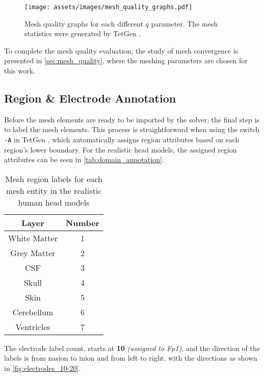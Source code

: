 \begin{figure}[H]
    \centering
    \texttt{[image: assets/images/mesh\_quality\_graphs.pdf]}
    \caption[Mesh quality graphs for each different $q$ parameter]{Mesh quality graphs for each different $q$ parameter. The mesh statistics were generated by TetGen \cite{tetgen}.}
    \label{fig:mesh_quality_graphs}
\end{figure}

To complete the mesh quality evaluation, the study of mesh convergence is presented in \autoref{sec:mesh_quality}, where the meshing parameters are chosen for this work.

\subsection{Region \& Electrode Annotation}
\label{subsec:elec_annotation}

Before the mesh elements are ready to be imported by the solver, the final step is to label the mesh elements. This process is straightforward when using the switch \texttt{-A} in TetGen \cite{tetgen}, which automatically assigns region attributes based on each region's lower boundary. For the realistic head models, the assigned region attributes can be seen in \autoref{tab:domain_annotation}.

\begin{table}[!ht]
	\centering
	\caption{Mesh region labels for each mesh entity in the realistic human head models}
	\label{tab:domain_annotation}
	\begin{tabular}{|c|c|}
		\hline
		\rowcolor[HTML]{C0C0C0} 
		{\color[HTML]{000000} \textbf{Layer}} & {\color[HTML]{000000} \textbf{Number}} \\ \hline
		White Matter & 1 \\ \hline
		Grey Matter & 2 \\ \hline
		\gls{CSF} & 3 \\ \hline
		Skull & 4 \\ \hline
		Skin & 5 \\ \hline
		Cerebellum & 6 \\ \hline
		Ventricles & 7 \\ \hline
	\end{tabular}
\end{table}

The electrode label count, starts at \textbf{10} \textit{(assigned to Fp1)}, and the direction of the labels is from \gls{nasion} to \gls{inion} and from left to right, with the directions as shown in \autoref{fig:electrodes_10-20}.

